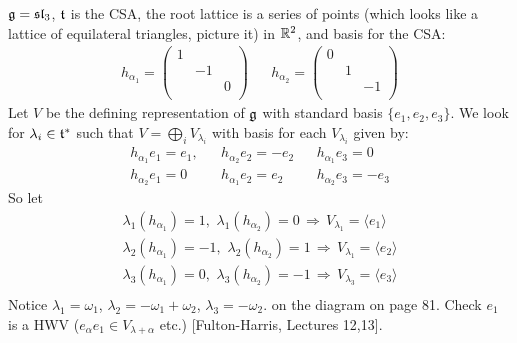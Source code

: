 \documentclass{article}
\begin{document}
\begin{ex*}
    $\mathfrak{g} = \mathfrak{sl}_{3}$, $\mathfrak{t}$ is the CSA, the root lattice is a series of points (which looks like a lattice of equilateral triangles, picture it) in $\mathbb{R}^{2}$, and basis for the CSA: \begin{align*}
        h_{\alpha_{1}}=\begin{pmatrix}
            1 & &\\
            & -1 &\\
            & & 0\\
        \end{pmatrix}
        & & h_{\alpha_{2}}=\begin{pmatrix}
            0 & &\\
            & 1 &\\
            & & -1\\
        \end{pmatrix}
    \end{align*}
    Let $V$ be the defining representation of $\mathfrak{g}$ with standard basis $\{e_{1},e_{2},e_{3}\}$. We look for $\lambda_{i} \in \mathfrak{t}^{*}$ such that $V=\bigoplus_{i}V_{\lambda_{i}}$ with basis for each $V_{\lambda_{i}}$ given by: \begin{align*}
        h_{\alpha_{1}}e_{1} = e_{1}, & & h_{\alpha_{2}}e_{2} = -e_{2} & & h_{\alpha_{1}}e_{3}=0\\
        h_{\alpha_{2}}e_{1}=0 & & h_{\alpha_{1}}e_{2}=e_{2} & & h_{\alpha_{2}}e_{3}=-e_{3}
    \end{align*}
    So let \begin{align*}
        \lambda_{1}(h_{\alpha_{1}})=1, \, \, \lambda_{1}(h_{\alpha_{2}})=0\, \Rightarrow\, V_{\lambda_{1}}=\langle e_{1} \rangle\\
        \lambda_{2}(h_{\alpha_{1}})=-1, \, \, \lambda_{2}(h_{\alpha_{2}})=1\, \Rightarrow\, V_{\lambda_{1}}=\langle e_{2} \rangle\\
        \lambda_{3}(h_{\alpha_{1}})=0, \, \, \lambda_{3}(h_{\alpha_{2}})=-1\, \Rightarrow\, V_{\lambda_{3}}=\langle e_{3} \rangle\\
    \end{align*}
    Notice $\lambda_{1} = \omega_{1}$, $\lambda_{2} = -\omega_{1} + \omega_{2}$, $\lambda_{3} = -\omega_{2}$. on the diagram on page 81. Check $e_{1}$ is a HWV ($e_{\alpha}e_{1}\in V_{\lambda + \alpha}$ etc.) [Fulton-Harris, Lectures 12,13]. 
\end{ex*}
\end{document}
